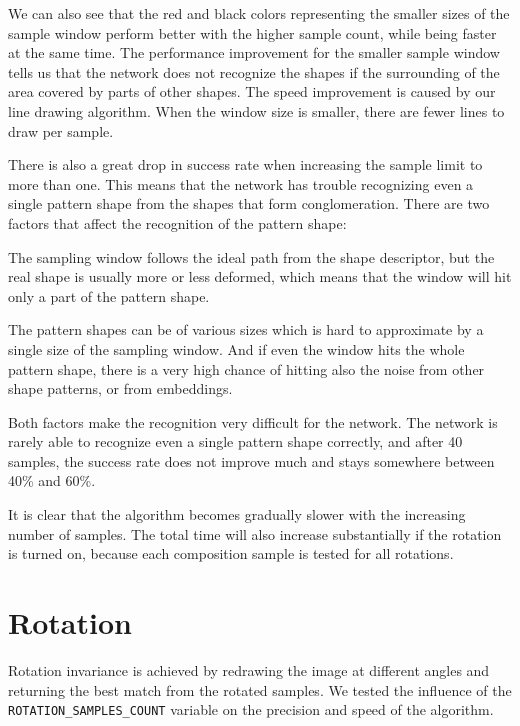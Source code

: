 We can also see that the red and black colors representing the smaller sizes of the sample window perform better with the higher sample count, while being faster at the same time. The performance improvement for the smaller sample window tells us that the network does not recognize the shapes if the surrounding of the area covered by parts of other shapes. The speed improvement is caused by our line drawing algorithm.  When the window size is smaller, there are fewer lines to draw per sample.

There is also a great  drop in success rate when increasing the sample limit to more than one. This means that the network has trouble recognizing even a single pattern shape from the shapes that form conglomeration. There are two factors that affect the recognition of the pattern shape:
\begin{description} 
\item The sampling window follows the ideal path from the shape descriptor, but the real shape is usually more or less deformed, which means that the window will hit only a part of the pattern shape. 
\item The pattern shapes can be of various sizes which is hard to approximate by a single size of the sampling window. And if even the window hits the whole pattern shape, there is a very high chance of hitting also the noise from other shape patterns, or from embeddings.
\end{description}
Both factors make the recognition very difficult for the network. The network is rarely able to recognize even a single pattern shape correctly, and after 40 samples, the success rate does not improve much and stays somewhere between 40\% and 60\%.

It is clear that the algorithm becomes gradually slower with the increasing number of samples. The total time will also increase substantially if the rotation is turned on, because each composition sample is tested for all rotations.

\section{Rotation}
Rotation invariance is achieved by redrawing the image at different angles and returning the best match from the rotated samples. We tested the influence of the \texttt{ROTATION\_SAMPLES\_COUNT} variable on the precision and speed of the algorithm. 

